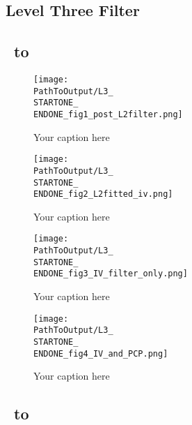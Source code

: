 \newpage

% 

\newpage

\begin{appendix}


\section{Level Three Filter}\label{app:lvl3}
\subsection{\STARTONE\ to \ENDONE }

\begin{figure}[H] %
  \centering
  \texttt{[image: \\PathToOutput/L3\_\\STARTONE\_\\ENDONE\_fig1\_post\_L2filter.png]}%
  \caption{Your caption here}
  \label{fig:your_label}
\end{figure}


\begin{figure}[H] %
  \centering
  \texttt{[image: \\PathToOutput/L3\_\\STARTONE\_\\ENDONE\_fig2\_L2fitted\_iv.png]}%
  \caption{Your caption here}
  \label{fig:your_label}
\end{figure}


\begin{figure}[H] %
  \centering
  \texttt{[image: \\PathToOutput/L3\_\\STARTONE\_\\ENDONE\_fig3\_IV\_filter\_only.png]}%
  \caption{Your caption here}
  \label{fig:your_label}
\end{figure}


\begin{figure}[H] %
  \centering
  \texttt{[image: \\PathToOutput/L3\_\\STARTONE\_\\ENDONE\_fig4\_IV\_and\_PCP.png]}%
  \caption{Your caption here}
  \label{fig:your_label}
\end{figure}

\newpage
\subsection{\STARTTWO\ to \ENDTWO }


\end{appendix}
